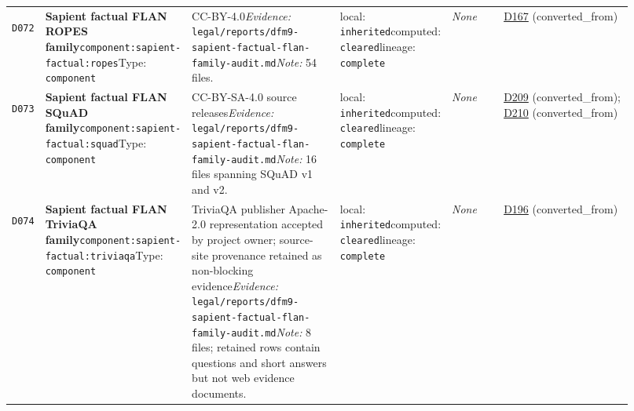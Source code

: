 \documentclass[9pt,a4paper]{article}
\newcommand{\depid}[1]{\hypertarget{dep:#1}{\texttt{#1}}}
\begin{document}
\begin{landscape}
\begin{longtable}{@{}L{0.035\linewidth}L{0.185\linewidth}L{0.27\linewidth}L{0.09\linewidth}L{0.10\linewidth}L{0.24\linewidth}@{}}
\depid{D072} & \textbf{Sapient factual FLAN ROPES family}\newline \nolinkurl{component:sapient-factual:ropes}\newline Type: \texttt{component} & CC-BY-4.0\newline \textit{Evidence:} \nolinkurl{legal/reports/dfm9-sapient-factual-flan-family-audit.md}\newline \textit{Note:} 54 files. & local: \texttt{inherited}\newline computed: \texttt{cleared}\newline lineage: \texttt{complete} & \textit{None} & \hyperlink{dep:D167}{D167} (converted\_from) \\
\depid{D073} & \textbf{Sapient factual FLAN SQuAD family}\newline \nolinkurl{component:sapient-factual:squad}\newline Type: \texttt{component} & CC-BY-SA-4.0 source releases\newline \textit{Evidence:} \nolinkurl{legal/reports/dfm9-sapient-factual-flan-family-audit.md}\newline \textit{Note:} 16 files spanning SQuAD v1 and v2. & local: \texttt{inherited}\newline computed: \texttt{cleared}\newline lineage: \texttt{complete} & \textit{None} & \hyperlink{dep:D209}{D209} (converted\_from); \hyperlink{dep:D210}{D210} (converted\_from) \\
\depid{D074} & \textbf{Sapient factual FLAN TriviaQA family}\newline \nolinkurl{component:sapient-factual:triviaqa}\newline Type: \texttt{component} & TriviaQA publisher Apache-2.0 representation accepted by project owner; source-site provenance retained as non-blocking evidence\newline \textit{Evidence:} \nolinkurl{legal/reports/dfm9-sapient-factual-flan-family-audit.md}\newline \textit{Note:} 8 files; retained rows contain questions and short answers but not web evidence documents. & local: \texttt{inherited}\newline computed: \texttt{cleared}\newline lineage: \texttt{complete} & \textit{None} & \hyperlink{dep:D196}{D196} (converted\_from) \\

\end{longtable}
\end{landscape}
\end{document}
